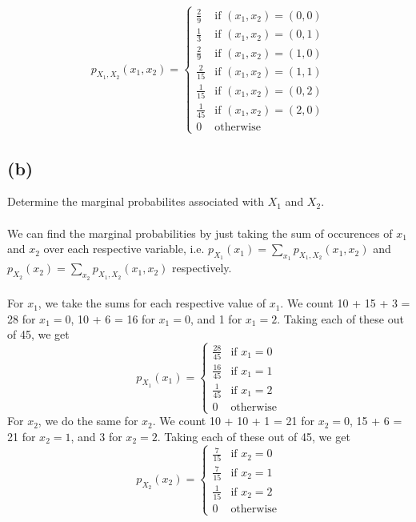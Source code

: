 \documentclass{article}
\begin{document}
{\[
p_{X_1, X_2}(x_1, x_2) = \begin{cases}
\frac{2}{9} & \text{if } (x_1, x_2) = (0,0) \\
\frac{1}{3} & \text{if } (x_1, x_2) = (0,1) \\
\frac{2}{9} & \text{if } (x_1, x_2) = (1,0) \\
\frac{2}{15} & \text{if } (x_1, x_2) = (1,1) \\
\frac{1}{15} & \text{if } (x_1, x_2) = (0,2) \\
\frac{1}{45} & \text{if } (x_1, x_2) = (2,0) \\
0 & \text{otherwise}
\end{cases}
\]

\subsection*{(b)} 
Determine the marginal probabilites associated with \(X_1\) and \(X_2\).
\\
\\
We can find the marginal probabilities by just taking the sum of occurences of \(x_1\) and \(x_2\) over each respective variable, i.e. \( p_{X_1} (x_1) = \sum_{x_1} p_{X_1, X_2} (x_1, x_2)   \) and \( p_{X_2} (x_2) = \sum_{x_2} p_{X_1, X_2} (x_1, x_2) \) respectively.
\\
\\
For \(x_1\), we take the sums for each respective value of \(x_1\). We count 10 + 15 + 3 = 28 for \(x_1 = 0\), 10 + 6 = 16 for \(x_1 = 0\), and 1 for \(x_1 = 2\). Taking each of these out of 45, we get 
\[
p_{X_1}(x_1) = \begin{cases}
\frac{28}{45} & \text{if } x_1 = 0 \\
\frac{16}{45} & \text{if } x_1 = 1 \\
\frac{1}{45} & \text{if } x_1 = 2 \\
0 & \text{otherwise}
\end{cases}
\]
For \(x_2\), we do the same for \(x_2\). We count 10 + 10 + 1 = 21 for \(x_2 = 0\), 15 + 6 = 21 for \(x_2 = 1\), and 3 for \(x_2 = 2\). Taking each of these out of 45, we get
\[
p_{X_2}(x_2) = \begin{cases}
\frac{7}{15} & \text{if } x_2 = 0 \\
\frac{7}{15} & \text{if } x_2 = 1 \\
\frac{1}{15} & \text{if } x_2 = 2 \\
0 & \text{otherwise}
\end{cases}
\]

}
\end{document}
